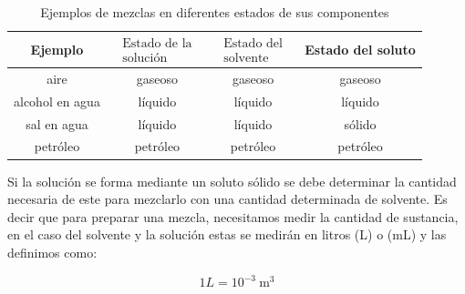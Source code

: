 \documentclass[11pt]{scrartcl}
\begin{document}
\begin{table}[H]
	\caption{ Ejemplos de mezclas en diferentes estados de sus componentes}
\begin{center}
\begin{tabular}{|c|c|c|c|}
\hline
Ejemplo & $\begin{array}{c}\text { Estado de la } \\ \text { solución }\end{array}$ & $\begin{array}{c}\text { Estado del } \\ \text { solvente }\end{array}$ & Estado del soluto \\
\hline
aire & gaseoso & gaseoso & gaseoso \\
\hline
alcohol en agua & líquido & líquido & líquido \\
\hline
sal en agua & líquido & líquido & sólido \\
\hline
petróleo & petróleo & petróleo & petróleo \\
\hline
\end{tabular}
\end{center}
\end{table}
Si la solución se forma mediante un soluto sólido se debe determinar la cantidad necesaria de este para mezclarlo con una cantidad determinada de solvente. Es decir que para preparar una mezcla, necesitamos medir la cantidad de sustancia, en el caso del solvente y la solución estas se medirán en litros (L) o (mL) y las definimos como:

\[
1 L=10^{-3} \mathrm{~m}^{3}
\]
\end{document}

